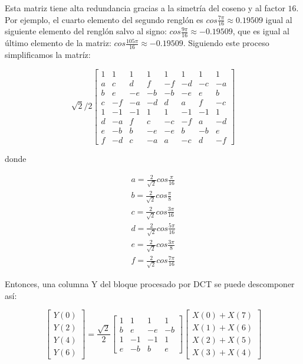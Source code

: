 Esta matriz tiene alta redundancia gracias a la simetría del coseno y al factor $16$. Por ejemplo, el cuarto elemento del segundo renglón es $cos\frac{7\pi}{16} \approx 0.19509$ igual al siguiente elemento del renglón salvo al signo: $cos\frac{9\pi}{16} \approx -0.19509$, que es igual al último elemento de la matriz: $cos\frac{105\pi}{16} \approx -0.19509$. Siguiendo este proceso simplificamos la matríz:

\begin{equation}
    \label{eq:dct-matrix-simple}
    \sqrt{2}/2
    \begin{bmatrix}
        1 & 1 & 1 & 1 & 1 & 1 & 1 & 1  \\
        a & c & d & f & -f & -d & -c & -a \\
        b & e & -e & -b & -b & -e & e & b \\
        c & -f & -a & -d & d & a & f & -c \\
        1 & -1 & -1 & 1 & 1 & -1 & -1 & 1\\
        d & -a & f & c & -c & -f & a & -d \\
        e & -b & b & -e & -e & b & -b & e \\
        f & -d & c & -a & a & -c & d & -f
    \end{bmatrix}
\end{equation}

donde

\begin{eqnarray*}
    a = \frac{2}{\sqrt{2}}cos\frac{\pi}{16}\\
    b = \frac{2}{\sqrt{2}}cos\frac{\pi}{8}\\
    c = \frac{2}{\sqrt{2}}cos\frac{3\pi}{16}\\
    d = \frac{2}{\sqrt{2}}cos\frac{5\pi}{16}\\
    e = \frac{2}{\sqrt{2}}cos\frac{3\pi}{8}\\
    f = \frac{2}{\sqrt{2}}cos\frac{7\pi}{16}
\end{eqnarray*}

Entonces, una columna Y del bloque procesado por DCT se puede descomponer así:

\begin{equation}
    \label{eq:dct-row}
    \begin{bmatrix}
        Y(0) \\
        Y(2) \\
        Y(4) \\
        Y(6)
    \end{bmatrix}
    = \frac{\sqrt{2}}{2} \begin{bmatrix}
        1 & 1 & 1 & 1  \\
        b & e & -e & -b \\
        1 & -1 & -1 & 1  \\
        e & -b & b & e
        \end {bmatrix} \begin {bmatrix}
        X(0) + X(7) \\
        X(1) + X(6) \\
        X(2) + X(5) \\
        X(3) + X(4)
        \end {bmatrix}
\end{equation}

